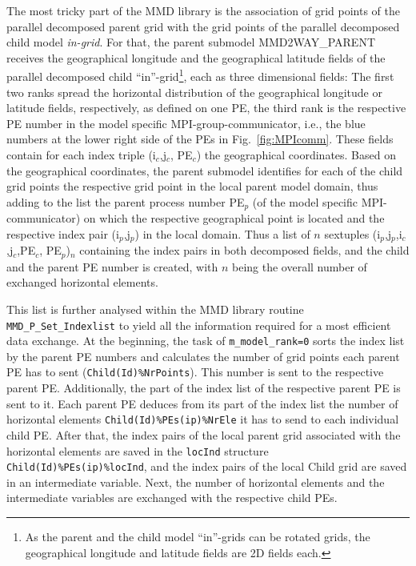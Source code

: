 \documentclass[twoside]{article}
\begin{document}
\begin{itemize}
The most tricky part of the MMD library is the association of grid points of 
the parallel decomposed parent grid with
the grid points of the parallel decomposed child model {\it in-grid}. 
For that, the parent submodel MMD2WAY\_PARENT receives the
geographical longitude and  
the geographical latitude fields of the parallel decomposed child  
 ``in''-grid\footnote{As the parent and the child model ``in''-grids
 can be rotated 
 grids, the geographical longitude and latitude fields are 2D fields each.},
 each as three dimensional fields: The first two ranks spread the
 horizontal distribution of the 
 geographical longitude or latitude fields, respectively, as defined on one 
PE, the third rank is the respective PE number in the model specific 
MPI-group-communicator, i.e., the blue numbers at the lower right side of the
PEs in Fig.\ \ref{fig:MPIcomm}. These fields
 contain for each index triple (i$_c$,j$_c$, PE$_c$) the geographical
 coordinates. 
 Based on the geographical coordinates, the parent 
submodel identifies for each of the child grid points the respective grid point
 in the local parent model domain, thus adding to the list the parent process 
number PE$_p$ (of the model specific MPI-communicator) on which the respective 
geographical point is located and the 
respective index pair  (i$_p$,j$_p$) in the local domain.
Thus a list of $n$ sextuples (i$_p$,j$_p$,i$_c$,j$_c$,PE$_c$, PE$_p$)$_n$  
containing the index pairs in both decomposed fields, and the child and the
 parent PE number is created, with $n$ being the overall number of exchanged 
horizontal elements.

This list is further analysed within the MMD library routine
 \verb|MMD_P_Set_Indexlist| to yield all the information
required for a most efficient data exchange. At the beginning, the task of 
\verb|m_model_rank=0| sorts the index list by the parent PE numbers and 
calculates the number of grid points  each parent PE has to sent 
(\verb|Child(Id)%NrPoints|). This number is sent to the respective parent PE. 
Additionally, the part of the index list of the respective parent PE
 is sent to it.
Each parent PE deduces from its part of the index list the number of 
horizontal elements \verb|Child(Id)%PEs(ip)%NrEle| it has to send to 
each individual child PE. After that, the index pairs of the local parent grid 
 associated with the horizontal elements are saved 
in the \verb|locInd| structure \verb|Child(Id)%PEs(ip)%locInd|, and the index 
pairs of the local Child grid are saved in an intermediate variable. 
Next, the number of horizontal elements and the
intermediate variables are exchanged with the respective child PEs. 


\end{itemize}
\end{document}
